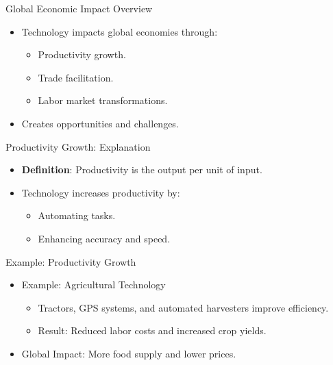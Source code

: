 \documentclass{beamer}
\begin{document}
\begin{frame}{Global Economic Impact Overview}
    \begin{itemize}
        \item Technology impacts global economies through:
        \begin{itemize}
            \item Productivity growth.
            \item Trade facilitation.
            \item Labor market transformations.
        \end{itemize}
        \item Creates opportunities and challenges.
    \end{itemize}
\end{frame}

\begin{frame}{Productivity Growth: Explanation}
    \begin{itemize}
        \item \textbf{Definition}: Productivity is the output per unit of input.
        \item Technology increases productivity by:
        \begin{itemize}
            \item Automating tasks.
            \item Enhancing accuracy and speed.
        \end{itemize}
    \end{itemize}
\end{frame}

\begin{frame}{Example: Productivity Growth}
    \begin{itemize}
        \item Example: Agricultural Technology
        \begin{itemize}
            \item Tractors, GPS systems, and automated harvesters improve efficiency.
            \item Result: Reduced labor costs and increased crop yields.
        \end{itemize}
        \item Global Impact: More food supply and lower prices.
    \end{itemize}
\end{frame}
\end{document}
